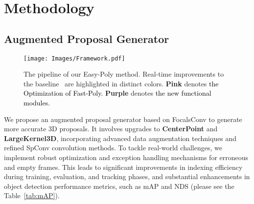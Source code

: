 \section{Methodology}
\label{sec: method}

\subsection{Augmented Proposal Generator}

 \begin{figure*}[t]
    \centering
    \texttt{[image: Images/Framework.pdf]}
    \vspace{-8pt}
    \caption
    {
       The pipeline of our Easy-Poly method. Real-time improvements to the baseline~\cite{li2024fast} are highlighted in distinct colors.
        \textbf{\textcolor[RGB]{255, 182, 193}{Pink}} denotes \textcolor{black}{the Optimization of Fast-Poly.}
        \textbf{\textcolor[RGB]{139, 58, 98}{Purple}} denotes \textcolor{black}{the new functional modules.}
     }
     \Description{}
    \label{fig: frameworkpoly}
\end{figure*}


We propose an augmented proposal generator based on FocalsConv to generate more accurate 3D proposals. It involves upgrades to \textbf{CenterPoint} and \textbf{LargeKernel3D}, incorporating advanced data augmentation techniques and refined SpConv convolution methods. To tackle real-world challenges, we implement robust optimization and exception handling mechanisms for erroneous and empty frames. This leads to significant improvements in indexing efficiency during training, evaluation, and tracking phases, and substantial enhancements in object detection performance metrics, such as mAP and NDS (please see the Table~\ref{tab:mAP}).

